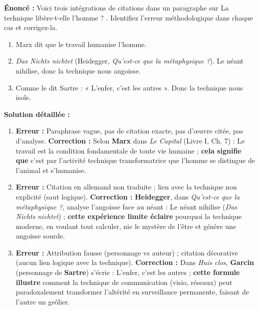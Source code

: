 \documentclass[11pt]{article}
\begin{document}
\begin{exoresolu}
\textbf{Énoncé :} Voici trois intégrations de citations dans un paragraphe sur \og La technique libère-t-elle l'homme ? \fg{}. Identifiez l'erreur méthodologique dans chaque cas et corrigez-la.

\begin{enumerate}
    \item \og Marx dit que le travail humanise l'homme. \fg{}
    \item \og \emph{Das Nichts nichtet} (Heidegger, \emph{Qu'est-ce que la métaphysique ?}). Le néant nihilise, donc la technique nous angoisse. \fg{}
    \item \og Comme le dit Sartre : « L'enfer, c'est les autres ». Donc la technique nous isole. \fg{}
\end{enumerate}

\textbf{Solution détaillée :}
\begin{enumerate}
    \item \textbf{Erreur :} Paraphrase vague, pas de citation exacte, pas d'œuvre citée, pas d'analyse. \textbf{Correction :} \og Selon \textbf{Marx} dans \emph{Le Capital} (Livre I, Ch. 7) : \og Le travail est la condition fondamentale de toute vie humaine \fg{} ; \textbf{cela signifie que} c'est par l'activité technique transformatrice que l'homme se distingue de l'animal et s'humanise. \fg{}
    \item \textbf{Erreur :} Citation en allemand non traduite ; lien avec la technique non explicité (saut logique). \textbf{Correction :} \og \textbf{Heidegger}, dans \emph{Qu'est-ce que la métaphysique ?}, analyse l'angoisse face au néant : \og Le néant nihilise \fg{} (\emph{Das Nichts nichtet}) ; \textbf{cette expérience limite éclaire} pourquoi la technique moderne, en voulant tout calculer, nie le mystère de l'être et génère une angoisse sourde. \fg{}
    \item \textbf{Erreur :} Attribution fausse (personnage vs auteur) ; citation décorative (aucun lien logique avec la technique). \textbf{Correction :} \og Dans \emph{Huis clos}, \textbf{Garcin} (personnage de \textbf{Sartre}) s'écrie : \og L'enfer, c'est les autres \fg{} ; \textbf{cette formule illustre} comment la technique de communication (visio, réseaux) peut paradoxalement transformer l'altérité en surveillance permanente, faisant de l'autre un geôlier. \fg{}
\end{enumerate}
\end{exoresolu}
\end{document}
